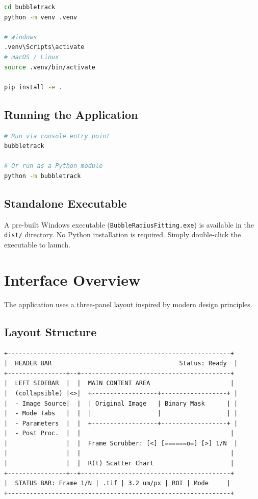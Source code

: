 \documentclass[11pt, letterpaper]{article}
\begin{document}
\begin{lstlisting}[language=bash]
cd bubbletrack
python -m venv .venv

# Windows
.venv\Scripts\activate
# macOS / Linux
source .venv/bin/activate

pip install -e .
\end{lstlisting}

\subsection{Running the Application}

\begin{lstlisting}[language=bash]
# Run via console entry point
bubbletrack

# Or run as a Python module
python -m bubbletrack
\end{lstlisting}

\subsection{Standalone Executable}

A pre-built Windows executable (\texttt{BubbleRadiusFitting.exe}) is available
in the \texttt{dist/} directory. No Python installation is required. Simply
double-click the executable to launch.


\section{Interface Overview}

The application uses a three-panel layout inspired by modern design principles.

\subsection{Layout Structure}

\begin{lstlisting}[basicstyle=\ttfamily\footnotesize, frame=none, backgroundcolor=\color{white}]
+-------------------------------------------------------------+
|  HEADER BAR                                   Status: Ready  |
+----------------+--+-----------------------------------------+
|  LEFT SIDEBAR  |  |  MAIN CONTENT AREA                      |
|  (collapsible) |<>|  +------------------+------------------+ |
|  - Image Source|  |  | Original Image   | Binary Mask      | |
|  - Mode Tabs   |  |  |                  |                  | |
|  - Parameters  |  |  +------------------+------------------+ |
|  - Post Proc.  |  |                                         |
|                |  |  Frame Scrubber: [<] [======o=] [>] 1/N  |
|                |  |                                         |
|                |  |  R(t) Scatter Chart                     |
+----------------+--+-----------------------------------------+
|  STATUS BAR: Frame 1/N | .tif | 3.2 um/px | ROI | Mode     |
+-------------------------------------------------------------+
\end{lstlisting}
\end{document}

